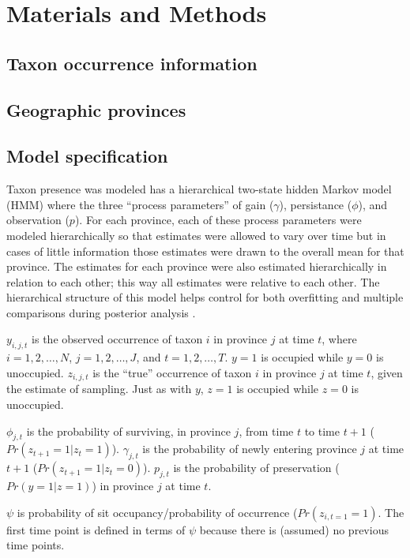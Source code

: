 \documentclass[12pt,letterpaper]{article}
\begin{document}
\section{Materials and Methods}

\subsection{Taxon occurrence information}

\subsection{Geographic provinces}

\subsection{Model specification}
Taxon presence was modeled has a hierarchical two-state hidden Markov model (HMM) where the three ``process parameters'' of gain (\(\gamma\)), persistance (\(\phi\)), and observation (\(p\)). For each province, each of these process parameters were modeled hierarchically so that estimates were allowed to vary over time but in cases of little information those estimates were drawn to the overall mean for that province. The estimates for each province were also estimated hierarchically in relation to each other; this way all estimates were relative to each other. The hierarchical structure of this model helps control for both overfitting and multiple comparisons during posterior analysis \citep{Gelman2007,Gelman2013d}.


\(y_{i, j, t}\) is the observed occurrence of taxon \(i\) in province \(j\) at time \(t\), where \(i = 1, 2, \dots, N\), \(j = 1, 2, \dots, J\), and \(t = 1, 2, \dots, T\). \(y = 1\) is occupied while \(y = 0\) is unoccupied. \(z_{i, j, t}\) is the ``true'' occurrence of taxon \(i\) in province \(j\) at time \(t\), given the estimate of sampling. Just as with \(y\), \(z = 1\) is occupied while \(z = 0\) is unoccupied. 

\(\phi_{j, t}\) is the probability of surviving, in province \(j\), from time \(t\) to time \(t + 1\) (\(Pr(z_{t + 1} = 1 | z_{t} = 1)\)). \(\gamma_{j, t}\) is the probability of newly entering province \(j\) at time \(t + 1\) (\(Pr(z_{t + 1} = 1 | z_{t} = 0)\)). \(p_{j, t}\) is the probability of preservation (\(Pr(y = 1 | z = 1)\)) in province \(j\) at time \(t\). 

\(\psi\) is probability of sit occupancy/probability of occurrence (\(Pr(z_{i, t = 1} = 1)\). The first time point is defined in terms of \(\psi\) because there is (assumed) no previous time points.
\end{document}
